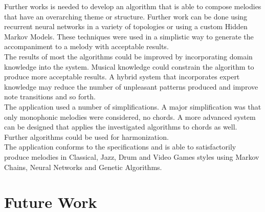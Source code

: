Further works is needed to develop an algorithm that is able to compose melodies that have an overarching theme or structure.  Further work can be done using recurrent neural networks in a variety of topologies or using a custom Hidden Markov Models. These techniques were used in a simplistic way to generate the accompaniment to a melody with acceptable results.
\\

The results of most the algorithms could be improved by incorporating domain knowledge into the system. Musical knowledge could constrain the algorithm to produce more acceptable results. A hybrid system that incorporates expert knowledge may reduce the number of unpleasant patterns produced and improve note transitions and so forth.
\\

The application used a number of simplifications. A major simplification was that only monophonic melodies were considered, no chords. A more advanced system can be designed that applies the investigated algorithms to chords as well. Further algorithms could be used for harmonization.
\\

The application conforms to the specifications and is able to satisfactorily produce melodies in Classical, Jazz, Drum and Video Games styles using Markov Chains, Neural Networks and Genetic Algorithms.

\chapter{Future Work}